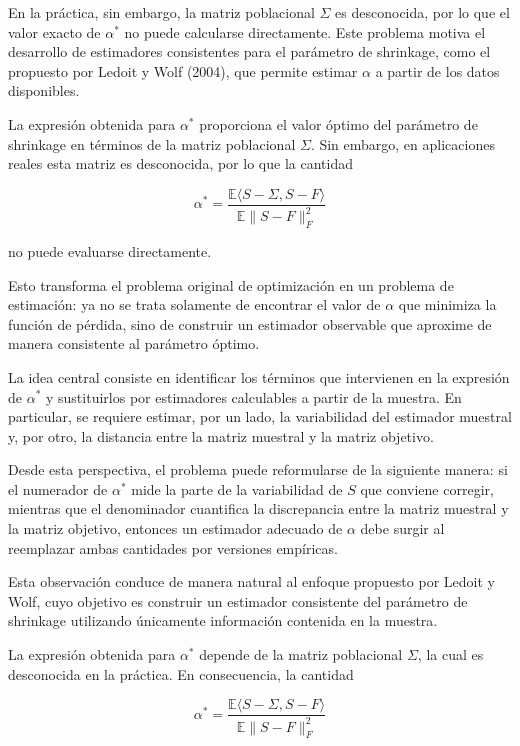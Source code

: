 \documentclass[letterpaper,12pt,oneside]{book}
\begin{document}
En la práctica, sin embargo, la matriz poblacional $\Sigma$ es desconocida, por lo que el valor exacto de $\alpha^*$ no puede calcularse directamente. Este problema motiva el desarrollo de estimadores consistentes para el parámetro de shrinkage, como el propuesto por Ledoit y Wolf (2004), que permite estimar $\alpha$ a partir de los datos disponibles.

La expresión obtenida para $\alpha^*$ proporciona el valor óptimo del parámetro de shrinkage en términos de la matriz poblacional $\Sigma$. Sin embargo, en aplicaciones reales esta matriz es desconocida, por lo que la cantidad

\[
\alpha^*
=
\frac{
\mathbb{E}\langle S-\Sigma,S-F\rangle
}{
\mathbb{E}\|S-F\|_F^2
}
\]

no puede evaluarse directamente.

Esto transforma el problema original de optimización en un problema de estimación: ya no se trata solamente de encontrar el valor de $\alpha$ que minimiza la función de pérdida, sino de construir un estimador observable que aproxime de manera consistente al parámetro óptimo.

La idea central consiste en identificar los términos que intervienen en la expresión de $\alpha^*$ y sustituirlos por estimadores calculables a partir de la muestra. En particular, se requiere estimar, por un lado, la variabilidad del estimador muestral y, por otro, la distancia entre la matriz muestral y la matriz objetivo.

Desde esta perspectiva, el problema puede reformularse de la siguiente manera: si el numerador de $\alpha^*$ mide la parte de la variabilidad de $S$ que conviene corregir, mientras que el denominador cuantifica la discrepancia entre la matriz muestral y la matriz objetivo, entonces un estimador adecuado de $\alpha$ debe surgir al reemplazar ambas cantidades por versiones empíricas.

Esta observación conduce de manera natural al enfoque propuesto por Ledoit y Wolf, cuyo objetivo es construir un estimador consistente del parámetro de shrinkage utilizando únicamente información contenida en la muestra.




La expresión obtenida para $\alpha^*$ depende de la matriz poblacional $\Sigma$, la cual es desconocida en la práctica. En consecuencia, la cantidad

\[
\alpha^*
=
\frac{
\mathbb{E}\langle S-\Sigma,S-F\rangle
}{
\mathbb{E}\|S-F\|_F^2
}
\]
\end{document}
